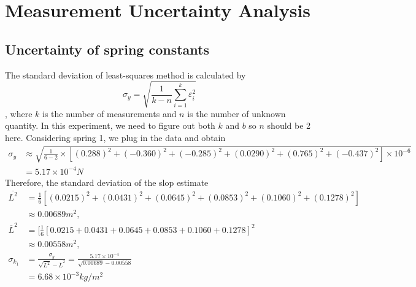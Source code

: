 \section{Measurement Uncertainty Analysis}
\subsection{Uncertainty of spring constants}
    The standard deviation of least-squares method is calculated by
    \[
        \sigma_y=\sqrt{\frac{1}{k-n}\sum_{i=1}^{k}\varepsilon_i^2}
    \],
    where $k$ is the number of measurements and $n$ is the number of unknown quantity. In this experiment, we need to figure out both $k$ and $b$ so $n$ should be 2 here. Considering spring 1, we plug in the data and obtain
    \[
    \begin{split}
        \sigma_y&\approx \sqrt{\frac{1}{6-2}\times [(0.288)^2+(-0.360)^2+(-0.285)^2+(0.0290)^2+(0.765)^2+(-0.437)^2]\times 10^{-6}}\\
        &=5.17\times10^{-4} N
    \end{split}
    \]
    Therefore, the standard deviation of the slop estimate
    \[
    \begin{split}
        \overline{L^2}&=\frac{1}{6}[(0.0215)^2+(0.0431)^2+(0.0645)^2+(0.0853)^2+(0.1060)^2+(0.1278)^2]\\[0.2cm]
        &\approx 0.00689 m^2,\\[0.4cm]
        \overline{L}^2&=[\frac{1}{6}[0.0215+0.0431+0.0645+0.0853+0.1060+0.1278]^2\\[0.2cm]
        &\approx 0.00558 m^2,\\[0.4cm]
        \sigma_{k_1}&=\frac{\sigma_y}{\sqrt{L^2}-\overline{L}^2}=\frac{5.17\times10^{-4}}{\sqrt{0.00689}-0.00558}\\[0.2cm]
        &=6.68\times10^{-3} kg/m^2
    \end{split}
    \]